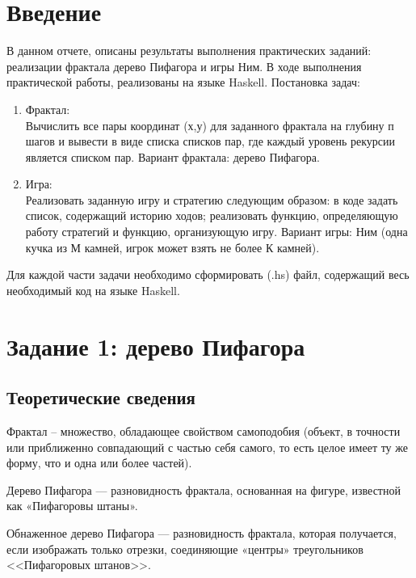 \documentclass[10pt,a4paper,final]{article} %
\begin{document}
\tableofcontents

\newpage

\section* {Введение}
\par В данном отчете, описаны результаты выполнения практических заданий: реализации фрактала дерево Пифагора и игры Ним. В ходе выполнения практической работы, реализованы на языке Haskell.
Постановка задач:
\begin{enumerate}
	\item Фрактал:\\
	Вычислить все пары координат (х,у) для заданного фрактала на глубину п шагов и вывести в виде списка списков пар, где каждый уровень рекурсии является списком пар. Вариант фрактала: дерево Пифагора.
	
	\item Игра:\\
	Реализовать заданную игру и стратегию следующим образом: в коде задать список, содержащий историю ходов; реализовать функцию, определяющую работу стратегий и функцию, организующую игру. Вариант игры: Ним (одна кучка из М камней, игрок может взять не более К камней).

\end{enumerate}
	Для каждой части задачи необходимо сформировать (.hs) файл, содержащий весь необходимый код на языке Haskell.
	
\newpage
\section{Задание 1: дерево Пифагора}
\subsection {Теоретические сведения}

Фрактал -- множество, обладающее свойством самоподобия (объект, в точности или приближенно совпадающий с частью себя самого, то есть целое имеет ту же форму, что и одна или более частей).

Дерево Пифагора — разновидность фрактала, основанная на фигуре, известной как «Пифагоровы штаны». 

Обнаженное дерево Пифагора — разновидность фрактала, которая получается, если изображать только отрезки, соединяющие «центры» треугольников <<Пифагоровых штанов>>. 
\end{document}
